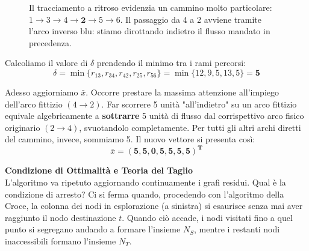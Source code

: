 \documentclass[12pt, a4paper]{article}
\newcommand{\separatore}{\noindent{\color{titlecolor!50}\rule{\textwidth}{0.6pt}}}
\begin{document}
\begin{figure}[H]
\begin{minipage}{0.45\textwidth}
			\caption*{Tabella 4: Backtracking del Cammino}
		\end{minipage}
		\caption{Il tracciamento a ritroso evidenzia un cammino molto particolare: $1 \to 3 \to 4 \to \mathbf{2} \to 5 \to 6$. Il passaggio da 4 a 2 avviene tramite l'arco inverso blu: stiamo dirottando indietro il flusso mandato in precedenza.}
	\end{figure}
	
	Calcoliamo il valore di $\delta$ prendendo il minimo tra i rami percorsi:
	\[ \delta = \min \{ r_{13}, r_{34}, r_{42}, r_{25}, r_{56} \} = \min \{ 12, 9, 5, 13, 5 \} = \mathbf{5} \]
	
	Adesso aggiorniamo $\bar{x}$. Occorre prestare la massima attenzione all'impiego dell'arco fittizio $(4\to2)$. Far scorrere 5 unità "all'indietro" su un arco fittizio equivale algebricamente a \textbf{sottrarre} 5 unità di flusso dal corrispettivo arco fisico originario $(2\to4)$, svuotandolo completamente. 
	Per tutti gli altri archi diretti del cammino, invece, sommiamo 5.
	Il nuovo vettore si presenta così:
	\[ \bar{x} = \mathbf{(5, 5, 0, 5, 5, 5, 5)^T} \]
	
	\vspace{0.6cm}
	\separatore
	\vspace{0.4cm}
	
	\textbf{Condizione di Ottimalità e Teoria del Taglio}\\
	L'algoritmo va ripetuto aggiornando continuamente i grafi residui. Qual è la condizione di arresto? 
	Ci si ferma quando, procedendo con l'algoritmo della Croce, la colonna dei nodi in esplorazione (a sinistra) si esaurisce senza mai aver raggiunto il nodo destinazione $t$. Quando ciò accade, i nodi visitati fino a quel punto si segregano andando a formare l'insieme $N_S$, mentre i restanti nodi inaccessibili formano l'insieme $N_T$.
	
\end{document}
